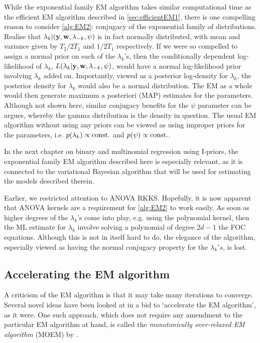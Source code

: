 While the exponential family EM algorithm takes similar computational time as the efficient EM algorithm described in \cref{sec:efficientEM1}, there is one compelling reason to consider \cref{alg:EM2}: conjugacy of the exponential family of distributions.
Realise that $\lambda_k|({\mathbf y},{\mathbf w},\lambda_{-k},\psi)$ is in fact normally distributed, with mean and variance given by $T_2/2T_1$ and $1/2T_1$ respectively.
If we were so compelled to assign a normal prior on each of the $\lambda_k$'s, then the conditionally dependent log-likelihood of $\lambda_k$, $L(\lambda_k|{\mathbf y},{\mathbf w},\lambda_{-k},\psi)$, would have a normal log-likelihood prior involving $\lambda_k$ added on.
Importantly, viewed as a posterior log-density for $\lambda_k$, the posterior density for $\lambda_k$ would also be a normal distribution.
The EM as a whole would then generate maximum a posteriori (MAP) estimates for the parameters.
Although not shown here, similar conjugacy benefits for the $\psi$ parameter can be argues, whereby the gamma distribution is the density in question.
The usual EM algorithm without using any priors can be viewed as using improper priors for the parameters, i.e. $p(\lambda_k) \propto \text{const.}\hspace{0.01em}$ and $p(\psi) \propto \text{const.}\hspace{0.01em}$.

In the next chapter on binary and multinomial regression using I-priors, the exponential family EM algorithm described here is especially relevant, as it is connected to the variational Bayesian algorithm \citep{bernardo2003variational} that will be used for estimating the models described therein.

\begin{remark}
  Earlier, we restricted attention to ANOVA RKKS. 
  Hopefully, it is now apparent that ANOVA kernels are a requirement for \cref{alg:EM2} to work easily.
  As soon as higher degrees of the $\lambda_k$'s come into play, e.g. using the polynomial kernel, then the ML estimate for $\lambda_k$ involve solving a polynomial of degree $2d-1$ the FOC equations.
  Although this is not in itself hard to do, the elegance of the algorithm, especially viewed as having the normal conjugacy property for the $\lambda_k's$, is lost.
\end{remark}

\subsection{Accelerating the EM algorithm}

A criticism of the EM algorithm is that it may take many iterations to converge.
Several novel ideas have been looked at in a bid to `accelerate the EM algorithm', as it were.
One such approach, which does not require any amendment to the particular EM algorithm at hand, is called the \emph{monotonically over-relaxed EM algorithm} (MOEM) by \citet{yu2012monotonically}.

